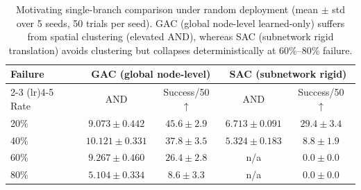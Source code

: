 \documentclass[11pt]{article}
\theoremstyle{plain}
\theoremstyle{definition}
\theoremstyle{remark}
\begin{document}
\begin{table}[t]
\centering
\caption{Motivating single-branch comparison under random deployment (mean $\pm$ std over 5 seeds, 50 trials per seed). GAC (global node-level learned-only) suffers from spatial clustering (elevated AND), whereas SAC (subnetwork rigid translation) avoids clustering but collapses deterministically at $60\%$--$80\%$ failure.}
\label{tab:gac-sac-random}
\small
\begin{tabular}{@{}lcccc@{}}
\toprule
Failure & \multicolumn{2}{c}{GAC (global node-level)} & \multicolumn{2}{c}{SAC (subnetwork rigid)} \\
\cmidrule(lr){2-3} \cmidrule(lr){4-5}
Rate & AND & Success/50 $\uparrow$ & AND & Success/50 $\uparrow$ \\
\midrule
20\% & $9.073 \pm 0.442$  & $45.6 \pm 2.9$ & $6.713 \pm 0.091$ & $29.4 \pm 3.4$ \\
40\% & $10.121 \pm 0.331$ & $37.8 \pm 3.5$ & $5.324 \pm 0.183$ & $8.8  \pm 1.9$ \\
60\% & $9.267 \pm 0.460$  & $26.4 \pm 2.8$ & n/a               & $0.0  \pm 0.0$ \\
80\% & $5.104 \pm 0.334$  & $8.6  \pm 3.3$ & n/a               & $0.0  \pm 0.0$ \\
\bottomrule
\end{tabular}
\end{table}
\end{document}
